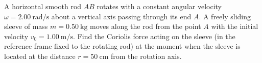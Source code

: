 \item A horizontal smooth rod \( AB \) rotates with a constant angular velocity \( \omega = 2.00 \ \text{rad/s} \) about a vertical axis passing through its end \( A \). A freely sliding sleeve of mass \( m = 0.50 \ \text{kg} \) moves along the rod from the point \( A \) with the initial velocity \( v_0 = 1.00 \ \text{m/s} \). Find the Coriolis force acting on the sleeve (in the reference frame fixed to the rotating rod) at the moment when the sleeve is located at the distance \( r = 50 \ \text{cm} \) from the rotation axis.
    \begin{center}
    \end{center}